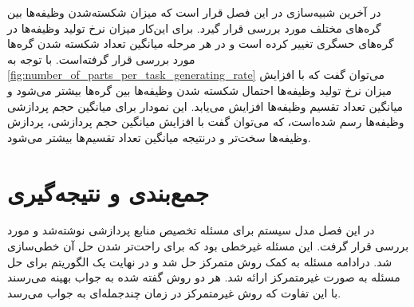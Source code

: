 	در آخرین شبیه‌سازی در این فصل قرار است که میزان شکسته‌شدن وظیفه‌ها بین گره‌های مختلف مورد بررسی قرار گیرد. برای این‌کار میزان نرخ تولید وظیفه‌ها در گره‌های حسگری تغییر کرده است و در هر مرحله میانگین تعداد شکسته شدن گره‌ها مورد بررسی قرار گرفته‌است. با توجه به \cref{fig:number_of_parts_per_task_generating_rate} می‌توان گفت که با افزایش میزان نرخ تولید وظیفه‌ها احتمال شکسته شدن وظیفه‌ها بین گره‌ها بیشتر می‌شود و میانگین تعداد تقسیم وظیفه‌ها افزایش می‌یابد. این نمودار برای میانگین حجم پردازشی وظیفه‌ها رسم شده‌است، که می‌توان گفت با افزایش میانگین حجم پردازشی، پردازش وظیفه‌ها سخت‌تر و درنتیجه میانگین تعداد تقسیم‌ها بیشتر می‌شود. 

	\section{جمع‌بندی و نتیجه‌گیری}
	در این فصل مدل سیستم برای مسئله تخصیص منابع پردازشی نوشته‌شد و مورد بررسی قرار گرفت. این مسئله غیرخطی بود که برای راحت‌تر شدن حل آن خطی‌سازی شد. درادامه مسئله به کمک روش متمرکز حل شد و در نهایت یک الگوریتم برای حل مسئله به صورت غیرمتمرکز ارائه شد. هر دو روش گفته شده به جواب بهینه می‌رسند با این تفاوت که روش غیرمتمرکز در زمان چندجمله‌ای به جواب می‌رسد.



